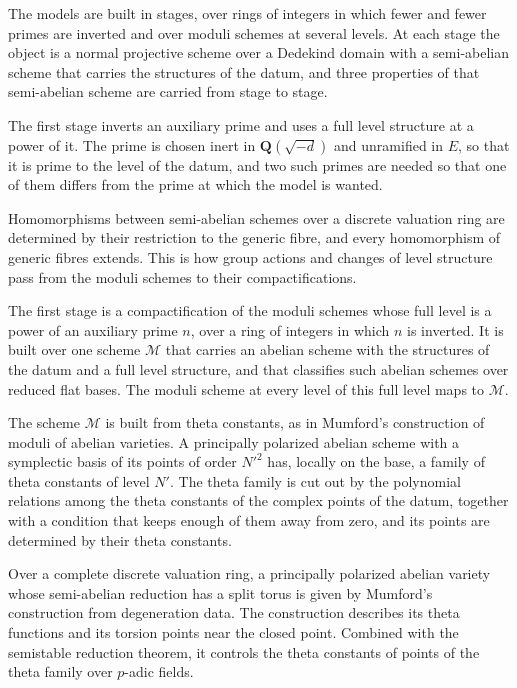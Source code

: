 The models are built in stages, over rings of integers in which fewer and fewer primes are inverted
and over moduli schemes at several levels. At each stage the object is a normal projective scheme over
a Dedekind domain with a semi-abelian scheme that carries the structures of the datum, and three
properties of that semi-abelian scheme are carried from stage to stage.

The first stage inverts an auxiliary prime and uses a full level structure at a power of it. The prime
is chosen inert in $\mathbf Q(\sqrt{-d})$ and unramified in $E$, so that it is prime to the level of
the datum, and two such primes are needed so that one of them differs from the prime at which the
model is wanted.

Homomorphisms between semi-abelian schemes over a discrete valuation ring are determined by their
restriction to the generic fibre, and every homomorphism of generic fibres extends. This is how group
actions and changes of level structure pass from the moduli schemes to their compactifications.

The first stage is a compactification of the moduli schemes whose full level is a power of an
auxiliary prime $n$, over a ring of integers in which $n$ is inverted. It is built over one scheme
$\mathcal M$ that carries an abelian scheme with the structures of the datum and a full level
structure, and that classifies such abelian schemes over reduced flat bases. The moduli scheme at
every level of this full level maps to $\mathcal M$.

The scheme $\mathcal M$ is built from theta constants, as in Mumford's construction of moduli of
abelian varieties. A principally polarized abelian scheme with a symplectic basis of its points of
order $N'^2$ has, locally on the base, a family of theta constants of level $N'$. The theta family is
cut out by the polynomial relations among the theta constants of the complex points of the datum,
together with a condition that keeps enough of them away from zero, and its points are determined by
their theta constants.

Over a complete discrete valuation ring, a principally polarized abelian variety whose semi-abelian
reduction has a split torus is given by Mumford's construction from degeneration data. The
construction describes its theta functions and its torsion points near the closed point. Combined
with the semistable reduction theorem, it controls the theta constants of points of the theta family
over $p$-adic fields.

